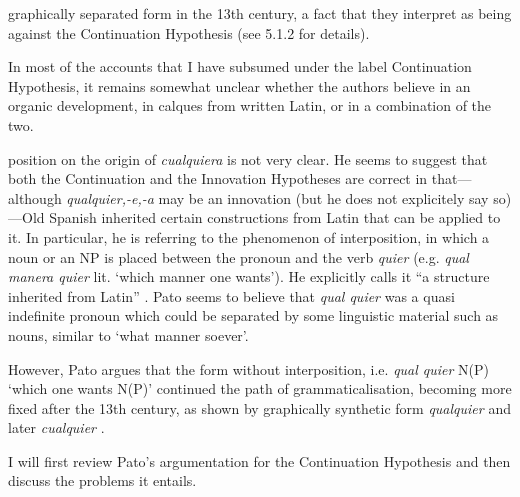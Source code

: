 graphically separated form in the 13th century, a fact that they interpret as being against the Continuation Hypothesis (see 5.1.2 for details).

  In most of the accounts that I have subsumed under the label Continuation Hypothesis, it remains somewhat unclear whether the authors believe in an organic development, in calques from written Latin, or in a combination of the two.

   position on the origin of \textit{cualquiera} is not very clear. He seems to suggest that both the Continuation and the Innovation Hypotheses are correct in that—although \textit{qualquier,\nobreakdash-e,\nobreakdash-a} may be an innovation (but he does not explicitely say so)—Old Spanish inherited certain constructions from Latin that can be applied to it. In particular, he is referring to the phenomenon of interposition, in which a noun or an NP is placed between the pronoun and the verb \textit{quier} (e.g. \textit{qual manera quier} lit. ‘which manner one wants’). He explicitly calls it “a structure inherited from Latin” \citep[273]{Pato2012}. Pato seems to believe that \textit{qual quier} was a quasi indefinite pronoun which could be separated by some linguistic material such as nouns, similar to ‘what manner soever’.

  However, Pato argues that the form without interposition, i.e. \textit{qual quier} N(P) ‘which one wants N(P)’ continued the path of grammaticalisation, becoming more fixed after the 13th century, as shown by graphically synthetic form \textit{qualquier} and later \textit{cualquier} \citep[297]{Pato2012}.

  I will first review Pato’s argumentation for the Continuation Hypothesis and then discuss the problems it entails. 

